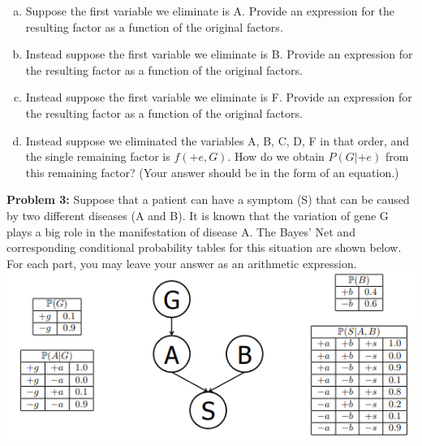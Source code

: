 \documentclass[a4paper]{article}
\newif\ifsol
\begin{document}
    \begin{enumerate}[a)]
        \item Suppose the first variable we eliminate is A. Provide an expression for the resulting factor as a function of the original factors.\\
        \ifsol {\color{blue} $f_1(B,C,D,+e) =  \sum_a P(a)P(B | a)P(C | a)P(D | a)P(+e | a)$} \bigskip 
        \else \bigskip \bigskip \bigskip
        \fi
        
        \item Instead suppose the first variable we eliminate is B. Provide an expression for the resulting factor as a function of the original factors.\\
        \ifsol {\color{blue} $f_2(A,F,C,D) =  \sum_b P(b | A)P(F | b,C,D)$} \bigskip
        \else \bigskip \bigskip \bigskip
        \fi
        
        \item Instead suppose the first variable we eliminate is F. Provide an expression for the resulting factor as a function of the original factors.\\
        \ifsol {\color{blue} $f_3(B,C,D,G) =  \sum_f P(f | B,C,D)P(G | f)$} \bigskip 
        \else \bigskip \bigskip \bigskip
        \fi
        
        \item Instead suppose we eliminated the variables A, B, C, D, F in that order, and the single remaining factor is $f(+e,G)$. How do we obtain $P(G | +e)$ from this remaining factor? (Your answer should be in the form of an equation.)\\
        \ifsol {\color{blue} $P (G | +e) = \frac{f(+e, G)}{\sum_g f(+e, g)}$} \bigskip
        \else \bigskip \bigskip \bigskip
        \fi
    \end{enumerate}
    \textbf{Problem 3:}  Suppose that a patient can have a symptom (S) that can be caused by two different diseases (A and B). It is known that the variation of gene G plays a big role in the manifestation of disease A. The Bayes’ Net and corresponding conditional probability tables for this situation are shown below. For each part, you may leave your answer as an arithmetic expression.\\
    \includegraphics[scale=0.75]{figs/net3.png}\\
\end{document}
